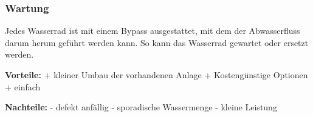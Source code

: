 \subsubsection{Wartung}
Jedes Wasserrad ist mit einem Bypass ausgestattet, mit dem der Abwasserfluss darum herum geführt werden kann. So kann das Wasserrad gewartet oder ersetzt werden.
\bigskip

\textbf{Vorteile:}								\newline
+	kleiner Umbau der vorhandenen Anlage			\newline
+	Kostengünstige Optionen						\newline
+	einfach										\newline
	
\textbf{Nachteile:}								\newline
- 	defekt anfällig								\newline
-	sporadische Wassermenge						\newline
-	kleine Leistung								\newline

